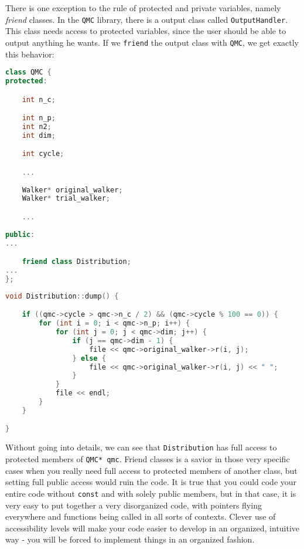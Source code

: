 There is one exception to the rule of protected and private variables, namely \textit{friend} classes. In the \verb+QMC+ library, there is a output class called \verb+OutputHandler+. This class needs access to protected variables, since the user should be able to output anything he wants. If we \verb+friend+ the output class with \verb+QMC+, we get exactly this behavior: 

\vspace{0.5 cm}
\begin{lstlisting}[language=c++]
class QMC {
protected:

    int n_c;

    int n_p;
    int n2;
    int dim;

    int cycle;

    ...
    
    Walker* original_walker;
    Walker* trial_walker;

    ...
    
public:
...

    friend class Distribution;
...
};
\end{lstlisting}

\begin{lstlisting}[language=c++]
void Distribution::dump() {

    if ((qmc->cycle > qmc->n_c / 2) && (qmc->cycle % 100 == 0)) {
        for (int i = 0; i < qmc->n_p; i++) {
            for (int j = 0; j < qmc->dim; j++) {
                if (j == qmc->dim - 1) {
                    file << qmc->original_walker->r(i, j);
                } else {
                    file << qmc->original_walker->r(i, j) << " ";
                }
            }
            file << endl;
        }
    }

}
\end{lstlisting}

Without going into details, we can see that \verb+Distribution+ has full access to protected members of \verb+QMC* qmc+. Friend classes is a savior in those very specific cases when you really need full access to protected members of another class, but setting full public access would ruin the code. It is true that you could code your entire code without \verb+const+ and with solely public members, but in that case, it is very easy to put together a very disorganized code, with pointers flying everywhere and functions being called in all sorts of contexts. Clever use of accessibility levels will make your code easier to develop in an organized, intuitive way - you will be forced to implement things in an organized fashion.




